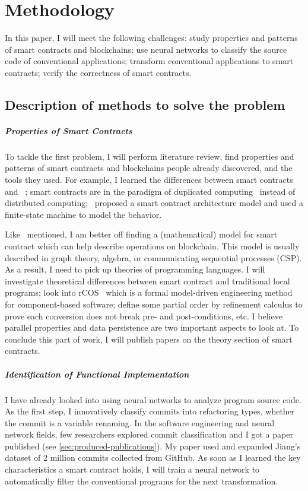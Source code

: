 \chapter{Methodology}

In this paper, I will meet the following challenges:
study properties and patterns of smart contracts and blockchains;
use neural networks to classify the source code of conventional applications;
transform conventional applications to smart contracts;
verify the correctness of smart contracts.


\section{Description of methods to solve the problem}

\paragraph*{Properties of Smart Contracts}
To tackle the first problem, I will perform literature review, find properties and patterns of smart contracts and blockchains people already discovered, and the tools they used.
For example, I learned the differences between smart contracts and {\dapp}~\cite{johnston2014general};
smart contracts are in the paradigm of duplicated computing~\cite{shae2018transform} instead of distributed computing;
\cite{yang2020implementation}~proposed a smart contract architecture model and used a finite-state machine to model the behavior.

Like~\cite{tolmach2021survey} mentioned, I am better off finding a (mathematical) model for smart contract which can help describe operations on blockchain. This model is usually described in graph theory, algebra, or communicating sequential processes (CSP).
As a result, I need to pick up theories of programming languages. I will investigate theoretical differences between smart contract and traditional local programs;
look into rCOS~\cite{ke2012rcos} which is a formal model-driven engineering method for component-based software;
define some partial order by refinement calculus to prove each conversion does not break pre- and post-conditions, etc.
I believe parallel properties and data persistence are two important aspects to look at.
To conclude this part of work, I will publish papers on the theory section of smart contracts.

\paragraph*{Identification of Functional Implementation}
I have already looked into using neural networks to analyze program source code.
As the first step, I innovatively classify commits into refactoring types, whether the commit is a variable renaming.
In the software engineering and neural network fields, few researchers explored commit classification and I got a paper published (see \autoref{sec:produced-publications}).
My paper used and expanded Jiang's dataset of 2 million commits collected from GitHub.
As soon as I learned the key characteristics a smart contract holds, I will train a neural network to automatically filter the conventional programs for the next transformation.


